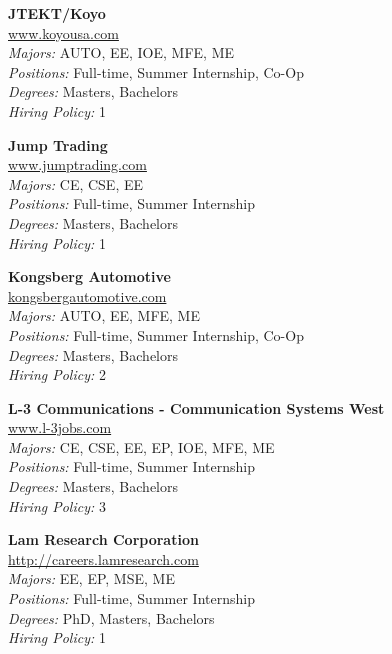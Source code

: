\documentclass{article}
\begin{document}
\begin{center}
\begin{multicols}{3}
\begin{minipage}{.9\columnwidth}{\Large\bf JTEKT/Koyo }\\
	\url{www.koyousa.com}\\
	\emph{Majors:} AUTO, EE, IOE, MFE, ME\\
	\emph{Positions:} Full-time, Summer Internship, Co-Op\\
	\emph{Degrees:} Masters, Bachelors\\
	\emph{Hiring Policy:} 1\\
\end{minipage}
 
\begin{minipage}{.9\columnwidth}{\Large\bf Jump Trading }\\
	\url{www.jumptrading.com}\\
	\emph{Majors:} CE, CSE, EE\\
	\emph{Positions:} Full-time, Summer Internship\\
	\emph{Degrees:} Masters, Bachelors\\
	\emph{Hiring Policy:} 1\\
\end{minipage}
 
\begin{minipage}{.9\columnwidth}{\Large\bf Kongsberg Automotive }\\
	\url{kongsbergautomotive.com}\\
	\emph{Majors:} AUTO, EE, MFE, ME\\
	\emph{Positions:} Full-time, Summer Internship, Co-Op\\
	\emph{Degrees:} Masters, Bachelors\\
	\emph{Hiring Policy:} 2\\
\end{minipage}
 
\begin{minipage}{.9\columnwidth}{\Large\bf L-3 Communications - Communication Systems West }\\
	\url{www.l-3jobs.com}\\
	\emph{Majors:} CE, CSE, EE, EP, IOE, MFE, ME\\
	\emph{Positions:} Full-time, Summer Internship\\
	\emph{Degrees:} Masters, Bachelors\\
	\emph{Hiring Policy:} 3\\
\end{minipage}
 
\begin{minipage}{.9\columnwidth}{\Large\bf Lam Research Corporation }\\
	\url{http://careers.lamresearch.com}\\
	\emph{Majors:} EE, EP, MSE, ME\\
	\emph{Positions:} Full-time, Summer Internship\\
	\emph{Degrees:} PhD, Masters, Bachelors\\
	\emph{Hiring Policy:} 1\\
\end{minipage}
 

\end{multicols}
\end{center}
\end{document}
